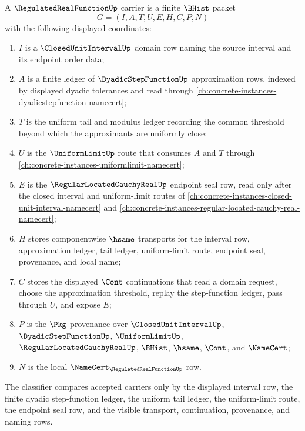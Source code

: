 \begin{definition}
\label{def:regulated-real-function-namecert-surface}
A $\RegulatedRealFunctionUp$ carrier is a finite $\BHist$ packet
$$
G=(I,A,T,U,E,H,C,P,N)
$$
with the following displayed coordinates:
\begin{enumerate}
\item $I$ is a $\ClosedUnitIntervalUp$ domain row naming the source interval and its endpoint order data;
\item $A$ is a finite ledger of $\DyadicStepFunctionUp$ approximation rows, indexed by displayed dyadic tolerances and read through \autoref{ch:concrete-instances-dyadicstepfunction-namecert};
\item $T$ is the uniform tail and modulus ledger recording the common threshold beyond which the approximants are uniformly close;
\item $U$ is the $\UniformLimitUp$ route that consumes $A$ and $T$ through \autoref{ch:concrete-instances-uniformlimit-namecert};
\item $E$ is the $\RegularLocatedCauchyRealUp$ endpoint seal row, read only after the closed interval and uniform-limit routes of \autoref{ch:concrete-instances-closed-unit-interval-namecert} and \autoref{ch:concrete-instances-regular-located-cauchy-real-namecert};
\item $H$ stores componentwise $\hsame$ transports for the interval row, approximation ledger, tail ledger, uniform-limit route, endpoint seal, provenance, and local name;
\item $C$ stores the displayed $\Cont$ continuations that read a domain request, choose the approximation threshold, replay the step-function ledger, pass through $U$, and expose $E$;
\item $P$ is the $\Pkg$ provenance over $\ClosedUnitIntervalUp$, $\DyadicStepFunctionUp$, $\UniformLimitUp$, $\RegularLocatedCauchyRealUp$, $\BHist$, $\hsame$, $\Cont$, and $\NameCert$;
\item $N$ is the local $\NameCert_{\RegulatedRealFunctionUp}$ row.
\end{enumerate}
The classifier compares accepted carriers only by the displayed interval row, the finite dyadic step-function ledger, the uniform tail ledger, the uniform-limit route, the endpoint seal row, and the visible transport, continuation, provenance, and naming rows.
\end{definition}

